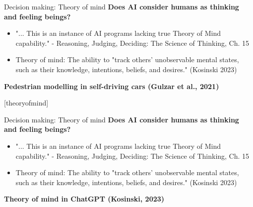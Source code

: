 \documentclass[8pt]{beamer}
\begin{document}
	\begin{frame}[t]{Decision making: Theory of mind}
		\textbf{Does AI consider humans as thinking and feeling beings?}
		\begin{itemize}
			\item "... This is an instance of AI programs lacking true Theory of Mind capability." - Reasoning, Judging, Deciding: The Science of Thinking, Ch. 15
			\item Theory of mind: The ability to "track others' unobservable mental states, such as their knowledge, intentions, beliefs, and desires." (Kosinski 2023)
		\end{itemize}
		\textbf{Pedestrian modelling in self-driving cars (Gulzar et al., 2021)}\\
		\centering
		\vspace{0.5cm}
	\end{frame}

	[theoryofmind]

	\begin{frame}[t]{Decision making: Theory of mind}
		\textbf{Does AI consider humans as thinking and feeling beings?}
		\begin{itemize}
			\item "... This is an instance of AI programs lacking true Theory of Mind capability." - Reasoning, Judging, Deciding: The Science of Thinking, Ch. 15
			\item Theory of mind: The ability to "track others' unobservable mental states, such as their knowledge, intentions, beliefs, and desires." (Kosinski 2023)
		\end{itemize}
		\textbf{Theory of mind in ChatGPT (Kosinski, 2023)}\\
		\centering
		\vspace{0.5cm}
	\end{frame}
\end{document}
